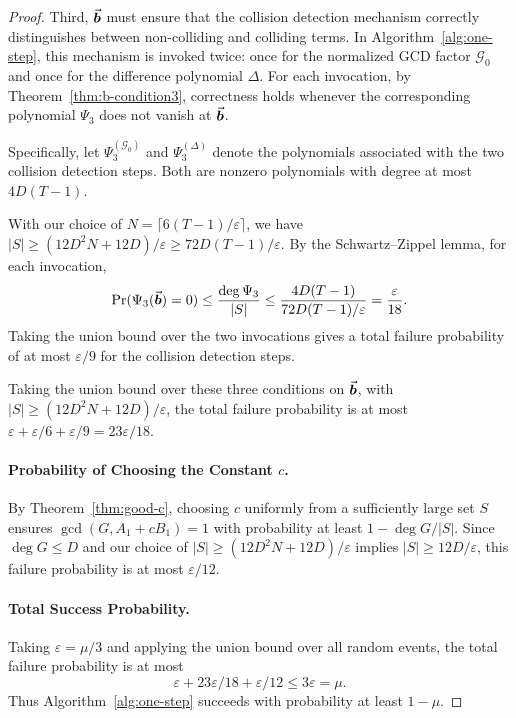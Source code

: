 \documentclass{article}
\numberwithin{equation}{section}
\begin{document}
\begin{proof}
Third, $\vec{\boldsymbol{b}}$ must ensure that the collision detection mechanism correctly distinguishes between non-colliding and colliding terms. In Algorithm~\ref{alg:one-step}, this mechanism is invoked twice: once for the normalized GCD factor $\mathcal{G}_0$ and once for the difference polynomial $\Delta$. For each invocation, by Theorem~\ref{thm:b-condition3}, correctness holds whenever the corresponding polynomial $\Psi_3$ does not vanish at $\vec{\boldsymbol{b}}$.

Specifically, let $\Psi_3^{(\mathcal{G}_0)}$ and $\Psi_3^{(\Delta)}$ denote the polynomials associated with the two collision detection steps. Both are nonzero polynomials with degree at most $4D(T-1)$. 

With our choice of $N = \lceil 6(T-1)/\varepsilon \rceil$, we have $|S| \ge (12D^2N + 12D)/\varepsilon \ge 72D(T-1)/\varepsilon$. By the Schwartz--Zippel lemma, for each invocation,
\[
\Pr(\Psi_3(\vec{\boldsymbol{b}}) = 0) \le \frac{\deg \Psi_3}{|S|}
\le \frac{4D(T-1)}{72D(T-1)/\varepsilon}
= \frac{\varepsilon}{18}.
\]
Taking the union bound over the two invocations gives a total failure probability of at most $\varepsilon/9$ for the collision detection steps.


Taking the union bound over these three conditions on $\vec{\boldsymbol{b}}$, with $|S| \ge (12D^2N + 12D)/\varepsilon$, the total failure probability is at most $\varepsilon+\varepsilon/6+\varepsilon/9=23\varepsilon/18$.

\paragraph{Probability of Choosing the Constant $c$.}
By Theorem~\ref{thm:good-c}, choosing $c$ uniformly from a sufficiently large set $S$ ensures $\gcd(G, A_1 + cB_1) = 1$ with probability at least $1 - \deg G / |S|$. Since $\deg G \le D$ and our choice of $|S| \ge (12D^2N + 12D)/\varepsilon$ implies $|S| \ge 12D/\varepsilon$, this failure probability is at most $\varepsilon/12$.

\paragraph{Total Success Probability.}
Taking $\varepsilon = \mu/3$ and applying the union bound over all random events, the total failure probability is at most
\[
\varepsilon + 23\varepsilon/18 + \varepsilon/12 \le 3\varepsilon=\mu.
\]
Thus Algorithm~\ref{alg:one-step} succeeds with probability at least $1-\mu$.


\end{proof}
\end{document}
